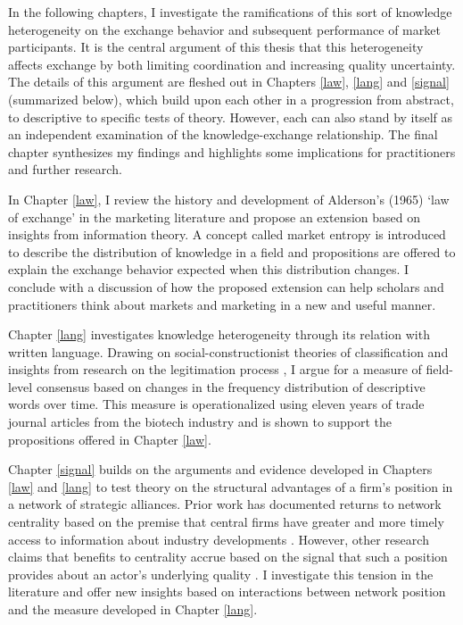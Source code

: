 In the following chapters, I investigate the ramifications of this sort of knowledge heterogeneity on the exchange behavior and subsequent performance of market participants. It is the central argument of this thesis that this heterogeneity affects exchange by both limiting coordination and increasing quality uncertainty. The details of this argument are fleshed out in Chapters \ref{law}, \ref{lang} and \ref{signal} (summarized below), which build upon each other in a progression from abstract, to descriptive to specific tests of theory. However, each can also stand by itself as an independent examination of the knowledge-exchange relationship. The final chapter synthesizes my findings and highlights some implications for practitioners and further research.

In Chapter \ref{law}, I review the history and development of Alderson's (1965) `law of exchange' in the marketing literature and propose an extension based on insights from information theory. A concept called market entropy is introduced to describe the distribution of knowledge in a field and propositions are offered to explain the exchange behavior expected when this distribution changes. I conclude with a discussion of how the proposed extension can help scholars and practitioners think about markets and marketing in a new and useful manner. 

Chapter \ref{lang} investigates knowledge heterogeneity through its relation with written language. Drawing on social-constructionist theories of classification \citep{goldberg2012} and insights from research on the legitimation process \citep{powell2008}, I argue for a measure of field-level consensus based on changes in the frequency distribution of descriptive words over time. This measure is operationalized using eleven years of trade journal articles from the biotech industry and is shown to support the propositions offered in Chapter \ref{law}. 

Chapter \ref{signal} builds on the arguments and evidence developed in Chapters \ref{law} and \ref{lang} to test theory on the structural advantages of a firm's position in a network of strategic alliances. Prior work has documented returns to network centrality based on the premise that central firms have greater and more timely access to information about industry developments \citep{powell1996, powell1999}. However, other research claims that benefits to centrality accrue based on the signal that such a position provides about an actor's underlying quality \citep{malter2014, podolny1993, podolny2005}. I investigate this tension in the literature and offer new insights based on interactions between network position and the measure developed in Chapter \ref{lang}.


